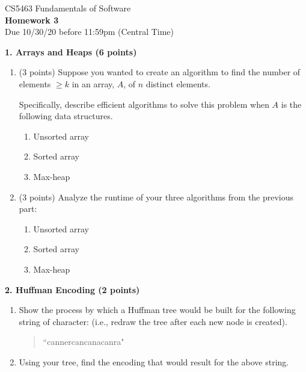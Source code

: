 \documentclass[12pt]{elsart}
\begin{document}
\pagestyle{empty}

\begin{center}
\Large  CS5463 Fundamentals of Software  \\
\large {\bf Homework 3}\\
\normalsize Due 10/30/20 before 11:59pm (Central Time)
\end{center}


{\bf 1.  Arrays and Heaps (6 points)}

\begin{enumerate}
\item (3 points) Suppose you wanted to create an algorithm to find the number of elements $\geq k$ in an array, $A$, of $n$ distinct elements.  

Specifically, describe efficient algorithms to solve this problem when $A$ is the following data structures.  

\begin{enumerate}
   \item Unsorted array
   \item Sorted array   
   \item Max-heap
\end{enumerate}

  \item (3 points) Analyze the runtime of your three algorithms from the previous part:

\begin{enumerate}
   \item Unsorted array
   \item Sorted array   
   \item Max-heap
\end{enumerate}

\end{enumerate}

{\bf 2. Huffman Encoding  (2 points)}

\begin{enumerate}
 \item Show the process by which a Huffman tree would be built for the following string of character: (i.e., redraw the tree after each new node is created).

\begin{quote}
 ``cannercancanacanra"
\end{quote}

 \item Using your tree, find the encoding that would result for the above string.
\end{enumerate}
\end{document}
